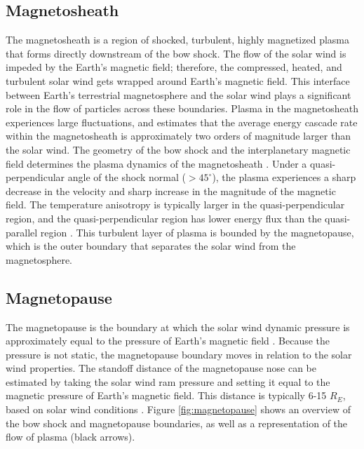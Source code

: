 \subsection{Magnetosheath}
The magnetosheath is a region of shocked, turbulent, highly magnetized plasma that forms directly downstream of the bow shock. The flow of the solar wind is impeded by the Earth's magnetic field; therefore, the compressed, heated, and turbulent solar wind gets wrapped around Earth's magnetic field. This interface between Earth's terrestrial magnetosphere and the solar wind plays a significant role in the flow of particles across these boundaries. Plasma in the magnetosheath experiences large fluctuations, and \cite{Hadid:2018} estimates that the average energy cascade rate within the magnetosheath is approximately two orders of magnitude larger than the solar wind. The geometry of the bow shock and the interplanetary magnetic field determines the plasma dynamics of the magnetosheath \citep{Yordanova:2020}. Under a quasi-perpendicular angle of the shock normal ($>45^\circ$), the plasma experiences a sharp decrease in the velocity and sharp increase in the magnitude of the magnetic field. The temperature anisotropy is typically larger in the quasi-perpendicular region, and the quasi-perpendicular region has lower energy flux than the quasi-parallel region \citep{Gurchumelia:2022}. This turbulent layer of plasma is bounded by the magnetopause, which is the outer boundary that separates the solar wind from the magnetosphere. 

\subsection{Magnetopause}
The magnetopause is the boundary at which the solar wind dynamic pressure is approximately equal to the pressure of Earth's magnetic field \citep{Shue:1997}. Because the pressure is not static, the magnetopause boundary moves in relation to the solar wind properties. The standoff distance of the magnetopause nose can be estimated by taking the solar wind ram pressure and setting it equal to the magnetic pressure of Earth's magnetic field. This distance is typically 6-15 $R_E$, based on solar wind conditions \citep{Collado-Vega:2023}. Figure \ref{fig:magnetopause} shows an overview of the bow shock and magnetopause boundaries, as well as a representation of the flow of plasma (black arrows). 

